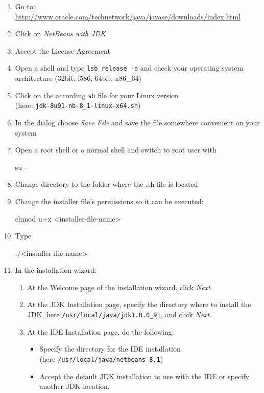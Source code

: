 \begin{enumerate}[noitemsep]
 \item Go to: \href{http://www.oracle.com/technetwork/java/javase/downloads/index.html}{http://www.oracle.com/technetwork/java/javase/downloads/index.html}
 \item Click on \textit{NetBeans with JDK}
 \item Accept the License Agreement
 \item Open a shell and type \lstinline[style=inlinecodestyle]+lsb_release -a+ and check your operating system architecture (32bit: i586; 64bit: x86\_64)
 \item Click on the according \verb+sh+ file for your Linux version\\
 (here: \verb+jdk-8u91-nb-8_1-linux-x64.sh+)
 \item In the dialog choose \textit{Save File} and save the file somewhere convenient on your system
 \item Open a root shell or a normal shell and switch to root user with
\begin{code}
su -
\end{code}
 \item Change directory to the folder where the .sh file is located
 \item Change the installer file's permissions so it can be executed:
\begin{code}
chmod u+x <installer-file-name>
\end{code}
 \item Type
\begin{code}
./<installer-file-name>
\end{code}
 \item In the installation wizard:
 \begin{enumerate}
  \item At the Welcome page of the installation wizard, click \textit{Next}.
  \item At the JDK Installation page, specify the directory where to install the JDK, here \verb+/usr/local/java/jdk1.8.0_91+, and click \textit{Next}.
  \item At the \marktool{\netbeansname} IDE Installation page, do the following:
  \begin{itemize}
   \item Specify the directory for the \marktool{\netbeansname} IDE installation\\
   (here \verb+/usr/local/java/netbeans-8.1+)
   \item Accept the default JDK installation to use with the IDE or specify another JDK location.

\end{itemize}
\end{enumerate}
\end{enumerate}
